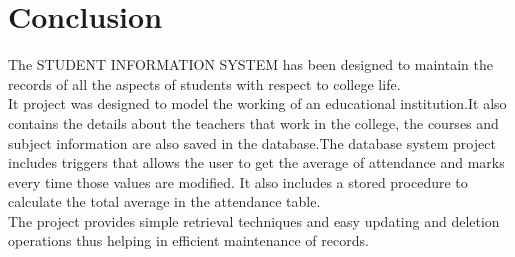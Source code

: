 \chapter{Conclusion}

The STUDENT INFORMATION SYSTEM has been designed to maintain the records of all the aspects of students with respect to college life.\\[0.1in] 

It project was designed  to model the working of an educational institution.It also contains the details about the teachers that work in the college, the courses and subject information are also saved in the database.The database system project includes triggers that allows the user to get the average of attendance and marks  every time those values are modified. It also includes a stored procedure to calculate the total average in the attendance table.\\[0.1in]

The project provides simple retrieval techniques and easy updating and deletion operations thus helping in efficient maintenance of records.
